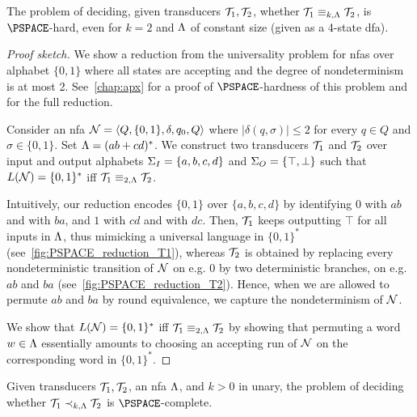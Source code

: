 \begin{theorem}
\label{thm:equivalence_PSPACE-H}
The problem of deciding, given transducers $\mathcal{T}_1,\mathcal{T}_2$, whether $\mathcal{T}_1\equiv_{k,\Lambda} \mathcal{T}_2$, is $\PSPACE$-hard, even for $k=2$ and $\Lambda$ of constant size (given as a 4-state \gls{dfa}).
\end{theorem}
\begin{proof}[Proof sketch]
We show a reduction from the universality problem for \glspl{nfa} over alphabet $\{0,1\}$ where all states are accepting and the degree of nondeterminism is at most 2. See~\cref{chap:apx} for a proof of $\PSPACE$-hardness of this problem and for the full reduction.

Consider an \gls{nfa} $\mathcal{N}=\left< Q,\{0,1\},\delta,q_0,Q\right>$ where $|\delta(q,\sigma)|\le 2$ for every $q\in Q$ and $\sigma\in \{0,1\}$. Set $\Lambda=(ab+cd)^*$. We construct two transducers $\mathcal{T}_1$ and $\mathcal{T}_2$ over input and output alphabets $\Sigma_{I}=\{a,b,c,d\}$ and $\Sigma_{O}=\{\top,\bot\}$ such that $L(\mathcal{N})=\{0,1\}^*$ iff $\mathcal{T}_1\equiv_{2,\Lambda}\mathcal{T}_2$. 

Intuitively, our reduction encodes $\{0,1\}$ over $\{a,b,c,d\}$ by identifying $0$ with $ab$ and with $ba$, and $1$ with $cd$ and with $dc$. Then, $\mathcal{T}_1$ keeps outputting $\top$ for all inputs in $\Lambda$, thus mimicking a universal language in $\{0,1\}^*$ (see~\cref{fig:PSPACE_reduction_T1}), whereas $\mathcal{T}_2$ is obtained by replacing every nondeterministic transition of $\mathcal{N}$ on e.g. 0 by two deterministic branches, on e.g. $ab$ and $ba$ (see~\cref{fig:PSPACE_reduction_T2}). Hence, when we are allowed to permute $ab$ and $ba$ by round equivalence, we capture the nondeterminism of $\mathcal{N}$.

We show that $L(\mathcal{N})=\{0,1\}^*$ iff $\mathcal{T}_1\equiv_{2,\Lambda}\mathcal{T}_2$ by showing that
permuting a word $w\in \Lambda$ essentially amounts to choosing an accepting run of $\mathcal{N}$ on the corresponding word in $\{0,1\}^*$.
\end{proof}

\begin{corollary}
\label{cor:PSPACE-C}
Given transducers $\mathcal{T}_1,\mathcal{T}_2$, an \gls{nfa} $\Lambda$, and $k>0$ in unary, the problem of deciding whether $\mathcal{T}_1\prec_{k,\Lambda}\mathcal{T}_2$ is $\PSPACE$-complete.
\end{corollary}
